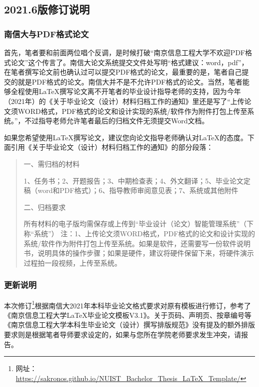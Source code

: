 \subsection*{2021.6版修订说明}

\subsubsection*{南信大与PDF格式论文}

首先，笔者要和前面两位唱个反调，是时候打破“南京信息工程大学不欢迎PDF格式论文”这个传言了。南信大论文系统提交文件处写明“格式建议：word，pdf”，在笔者撰写论文前也确认过可以提交PDF格式的论文，最重要的是，笔者自己提交的就是PDF格式的论文。南信大并不是不允许PDF格式的论文。当然，笔者能够全程使用\LaTeX 撰写论文离不开笔者的毕业设计指导老师的支持，因为今年（2021年）的《关于毕业论文（设计）材料归档工作的通知》里还是写了“上传论文须WORD格式，PDF格式的论文和设计实现的系统/软件作为附件打包上传至系统。”，不过指导老师允许笔者最后的归档文件无须提交Word文档。

如果您希望使用\LaTeX 撰写论文，建议您向论文指导老师确认对\LaTeX 的态度。下面引用《关于毕业论文（设计）材料归档工作的通知》的部分段落：

\begin{quote}
    一、需归档的材料

    1、任务书；2、开题报告；3、中期检查表；4、外文翻译；5、毕业论文定稿（word和PDF格式）；6、指导教师审阅意见表；7、系统或其他附件

    二、归档要求

    所有材料的电子版均需保存或上传到“毕业设计（论文）智能管理系统”（下称“系统”）
    注：1、上传论文须WORD格式，PDF格式的论文和设计实现的系统/软件作为附件打包上传至系统。如果是软件，还需要写一份软件说明书，说明具体的操作步骤；如果是硬件，建议将硬件保留下来，将硬件演示过程拍一段视频，上传至系统。
\end{quote}

\subsubsection*{更新说明}

本次修订\footnote{网址：\url{https://sakronos.github.io/NUIST_Bachelor_Thesis_LaTeX_Template/}}根据南信大2021年本科毕业论文格式要求对原有模板进行修订，参考了《南京信息工程大学LaTeX毕业论文模板V3.1》\cite{geiNanJingXinXiGongChengDaXueLaTeXBiYeLunWenMoBanV31GengXinWuXuYiLaiCTeXRuanJian2021}。关于页码、声明页、按章编号等《南京信息工程大学本科生毕业论文（设计）撰写排版规范》没有提及的额外排版要求则是根据笔者导师要求设定的，如果与您所在学院老师要求发生冲突，请报告。

